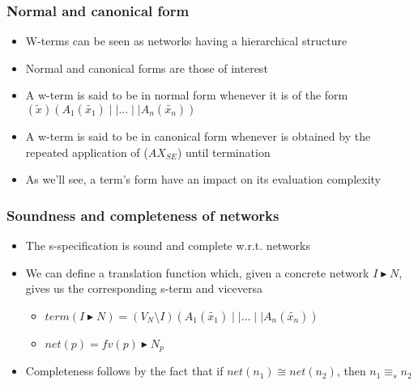 \documentclass{beamer}
\begin{document}
\begin{frame}
\frametitle{Normal and canonical form}
\begin{itemize}
	\item W-terms can be seen as networks having a hierarchical structure
\medskip
	\item Normal and canonical forms are those of interest
\medskip
	\item A w-term is said to be in normal form whenever it is of the form
	$(\widetilde{x})(A_1(\widetilde{x_1}) \mid \mid ... \mid \mid A_n(\widetilde{x_n}))$
\medskip
	\item A w-term is said to be in canonical form whenever is obtained by the repeated
	application of ($AX_{SE}$) until termination
\medskip
	\item As we'll see, a term's form have an impact on its evaluation complexity
\end{itemize}
\end{frame}

\begin{frame}
\frametitle{Soundness and completeness of networks}
\begin{itemize}
	\item The s-specification is sound and complete w.r.t. networks
\medskip
	\item We can define a translation function which, given a concrete network 
	$I \blacktriangleright N$, gives us the corresponding s-term and viceversa
	\begin{itemize}
		\item $term(I \blacktriangleright N) = (V_N \setminus I) 
		(A_1(\widetilde{x_1}) \mid \mid ... \mid \mid A_n(\widetilde{x_n}))$
		\item $net(p) = fv(p) \blacktriangleright N_p$
	\end{itemize}
\medskip
	\item Completeness follows by the fact that if $net(n_1) \cong net(n_2)$, then
	$n_1 \equiv_s n_2$
\end{itemize}
\end{frame}
\end{document}
